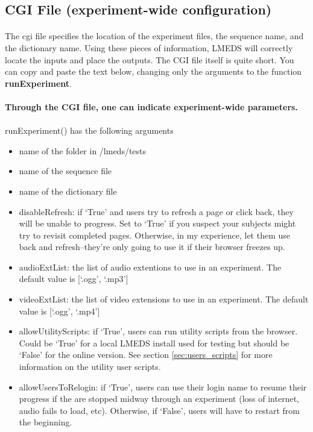 \subsection{CGI File (experiment-wide configuration)}
\label{sec:cgitemplate}

\paragraph{}
The cgi file  specifies the location of the experiment files, the sequence name, and the dictionary name.  Using these pieces of information, LMEDS will correctly locate the inputs and place the outputs.  The CGI file itself is quite short.  You can copy and paste the text below, changing only the arguments to the function \textbf{runExperiment}.

\paragraph{}
\textbf{Through the CGI file, one can indicate experiment-wide parameters.}

\paragraph{}
runExperiment() has the following arguments

\begin{itemize}
\item name of the folder in /lmeds/tests
\item name of the sequence file
\item name of the dictionary file
\item disableRefresh: if `True' and users try to refresh a page or click back, they will be unable to progress.  Set to `True' if you suspect your subjects might try to revisit completed pages.  Otherwise, in my experience, let them use back and refresh--they're only going to use it if their browser freezes up.
\item audioExtList: the list of audio extentions to use in an experiment.  The default value is [`.ogg', `.mp3']
\item videoExtList: the list of video extensions to use in an experiment.  The default value is [`.ogg', `.mp4']
\item allowUtilityScripts: if `True', users can run utility scripts from the browser.  Could be `True' for a local LMEDS install used for testing but should be `False' for the online version.  See section \ref{sec:users_scripts} for more information on the utility user scripts.
\item allowUsersToRelogin: if `True', users can use their login name to resume their progress if the are stopped midway through an experiment (loss of internet, audio fails to load, etc).  Otherwise, if `False', users will have to restart from the beginning.
\end{itemize}

